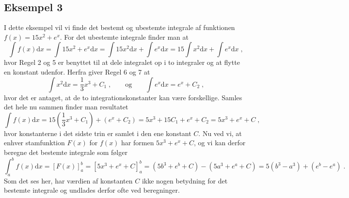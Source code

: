\subsection{Eksempel 3}
I dette eksempel vil vi finde det bestemt og ubestemte integrale af funktionen $f(x) = 15x^2 + e^x$. For det ubestemte integrale finder man at
\begin{equation*}
\int f(x) \text{d}x = \int 15x^2 + e^x \text{d}x = \int 15x^2 \text{d}x + \int e^x \text{d}x = 15 \int x^2 \text{d}x + \int e^x \text{d}x \; ,
\end{equation*}
hvor Regel 2 og 5 er benyttet til at dele integralet op i to integraler og at flytte en konstant udenfor. Herfra giver Regel 6 og 7 at
\begin{equation*}
\int x^2 \text{d}x = \frac{1}{3} x^3 + C_1 \; , \qquad \text{og} \qquad \int e^x \text{d}x = e^x + C_2 \; ,
\end{equation*}
hvor det er antaget, at de to integrationskonstanter kan være forskellige. Samles det hele nu sammen finder man resultatet
\begin{equation*}
\int f(x) \text{d}x = 15\left( \frac{1}{3} x^3 + C_1 \right) + \left( e^x + C_2 \right) = 5x^3 + 15C_1 + e^x + C_2 = 5x^3 + e^x + C \; ,
\end{equation*}
hvor konstanterne i det sidste trin er samlet i den ene konstant $C$. Nu ved vi, at enhver stamfunktion $F(x)$ for $f(x)$ har formen $5x^3 + e^x + C$, og vi kan derfor beregne det bestemte integrale som følger
\begin{equation*}
\int_a^b f(x) \text{d}x = [F(x)]_ a^b = \left[ 5x^3 + e^x + C \right]_a^b = \left( 5b^3 + e^b + C \right) - \left( 5a^3 + e^a + C \right) = 5 \left( b^3 - a^3 \right) + \left( e^b - e^a \right) \; .
\end{equation*}
Som det ses her, har værdien af konstanten $C$ ikke nogen betydning for det bestemte integrale og undlades derfor ofte ved beregninger.

